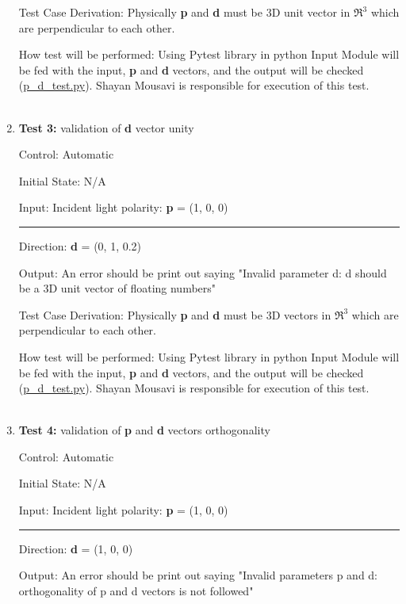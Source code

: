 \documentclass[12pt, titlepage]{article}
\begin{document}
\begin{enumerate}
Test Case Derivation: Physically \textbf{p} and \textbf{d} must be 3D unit vector in $\Re^3$ which are perpendicular to each other.

How test will be performed: Using Pytest library in python Input Module will be fed with the input, \textbf{p} and \textbf{d} vectors, and the output will be checked (\href{https://github.com/shmouses/SPDFM/tree/master/src}{p\_d\_test.py}). Shayan Mousavi is responsible for execution of this test. 
\\
\\

\item{\textbf{Test 3:} validation of \textbf{d} vector unity \\}

Control: Automatic

Initial State: N/A

Input: Incident light polarity: \textbf{p} = (1, 0, 0)\\
\rule{1.15cm}{0pt} Direction: \textbf{d} = (0, 1, 0.2)

Output: An error should be print out saying "Invalid parameter d: d should be a 3D unit vector of floating numbers"  

Test Case Derivation: Physically \textbf{p} and \textbf{d} must be 3D vectors in $\Re^3$ which are perpendicular to each other.

How test will be performed: Using Pytest library in python Input Module will be fed with the input, \textbf{p} and \textbf{d} vectors, and the output will be checked (\href{https://github.com/shmouses/SPDFM/tree/master/src}{p\_d\_test.py}). Shayan Mousavi is responsible for execution of this test.
\\
\\

\item{\textbf{Test 4:} validation of \textbf{p} and \textbf{d} vectors orthogonality \\}

Control: Automatic

Initial State: N/A

Input: Incident light polarity: \textbf{p} = (1, 0, 0)\\
\rule{1.15cm}{0pt} Direction: \textbf{d} = (1, 0, 0)

Output: An error should be print out saying "Invalid parameters p and d: orthogonality of p and d vectors is not followed"  


\end{enumerate}
\end{document}
